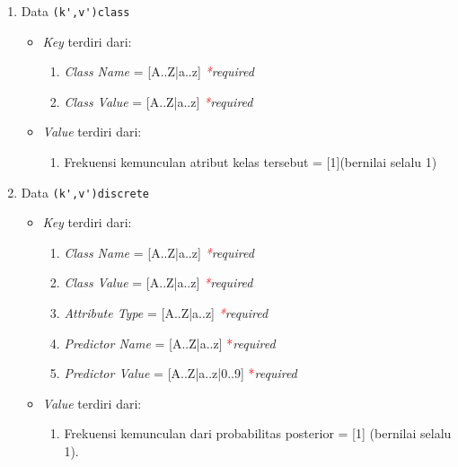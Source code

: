 \begin{enumerate}
	\item{Data \verb|(k',v')class|}
	\begin{itemize}
		\item \textit{Key} terdiri dari:
		\begin{enumerate}
			\item \textit{Class Name} = [A..Z|a..z] \textit{\textcolor{red}{*}required}
			\item \textit{Class Value} = [A..Z|a..z] \textit{\textcolor{red}{*}required}
		\end{enumerate}
		\item \textit{Value} terdiri dari:
		\begin{enumerate}
			\item Frekuensi kemunculan atribut kelas tersebut = [1](bernilai selalu 1)
		\end{enumerate}
	\end{itemize}
	
	\item{Data \verb|(k',v')discrete|}
	\begin{itemize}
		\item \textit{Key} terdiri dari:
		\begin{enumerate}
			\item \textit{Class Name} = [A..Z|a..z] \textit{\textcolor{red}{*}required}
			\item \textit{Class Value} = [A..Z|a..z] \textit{\textcolor{red}{*}required}
			\item \textit{Attribute Type} = [A..Z|a..z] \textit{\textcolor{red}{*}required}
			\item \textit{Predictor Name} = [A..Z|a..z] \textcolor{red}{*}\textit{required}
			\item \textit{Predictor Value} = [A..Z|a..z|0..9] \textcolor{red}{*}\textit{required}
		\end{enumerate}
		\item \textit{Value} terdiri dari:
		\begin{enumerate}
			\item Frekuensi kemunculan dari probabilitas posterior = [1] (bernilai selalu 1).
		\end{enumerate}
	\end{itemize}


\end{enumerate}
